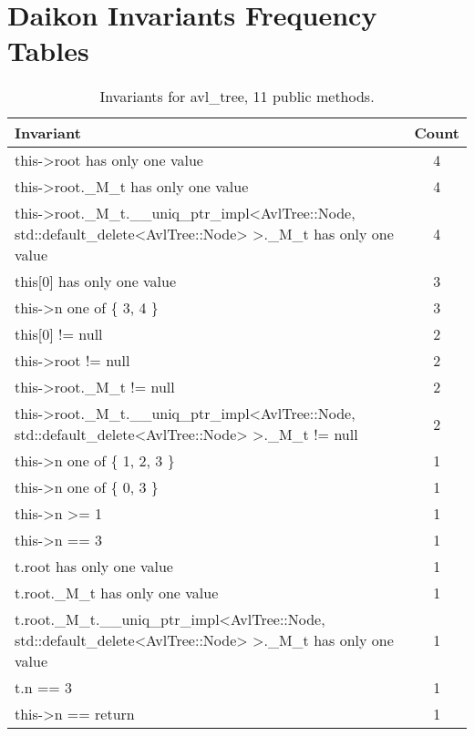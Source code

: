 \section{Daikon Invariants Frequency Tables}
\begin{table}[ht]
\centering
\scriptsize
\caption{Invariants for avl\_tree, 11 public methods.}
\label{avl_tree_daikon}
\begin{tabular}{|l|c|}
\hline
Invariant & Count \\
\hline
this->root has only one value & 4 \\
this->root.\_M\_t has only one value & 4 \\
this->root.\_M\_t.\_\_uniq\_ptr\_impl<AvlTree::Node, std::default\_delete<AvlTree::Node> >.\_M\_t has only one value & 4 \\
this[0] has only one value & 3 \\
this->n one of \{ 3, 4 \} & 3 \\
this[0] != null & 2 \\
this->root != null & 2 \\
this->root.\_M\_t != null & 2 \\
this->root.\_M\_t.\_\_uniq\_ptr\_impl<AvlTree::Node, std::default\_delete<AvlTree::Node> >.\_M\_t != null & 2 \\
this->n one of \{ 1, 2, 3 \} & 1 \\
this->n one of \{ 0, 3 \} & 1 \\
this->n >= 1 & 1 \\
this->n == 3 & 1 \\
t.root has only one value & 1 \\
t.root.\_M\_t has only one value & 1 \\
t.root.\_M\_t.\_\_uniq\_ptr\_impl<AvlTree::Node, std::default\_delete<AvlTree::Node> >.\_M\_t has only one value & 1 \\
t.n == 3 & 1 \\
this->n == return & 1 \\
\hline
\end{tabular}
\end{table}


